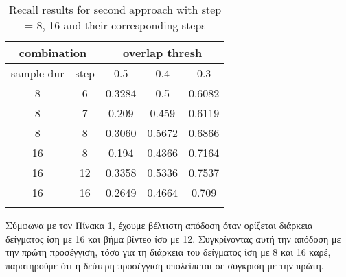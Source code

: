 \begin{center}
\en
\begin{longtable}{||c c||c c c||}
  \hline
  \multicolumn{2}{||c||}{\textbf{combination}} &\multicolumn{3}{|c||}{\textbf{overlap thresh}}\\

  \hline
  sample dur & step &   0.5  &  0.4 &  0.3 \\
  \hline   \hline
  8 & 6 & 0.3284 & 0.5 & 0.6082  \\
  \hline
  8 & 7 & 0.209	& 0.459 & 0.6119 \\
  \hline
  8 & 8 & 0.3060 & 0.5672 & 0.6866 \\
  \hline
  16 & 8  & 0.194 & 0.4366 & 0.7164 \\
  \hline
  16 & 12 & 0.3358 & 0.5336 & 0.7537 \\
  \hline
  16 & 16 & 0.2649 & 0.4664 & 0.709 \\
  
  \hline 

  \caption{Recall results for second approach with step = 8, 16 and their corresponding steps }
  \label{table:gr_conn_app2}
\end{longtable} 
\end{center}

Σύμφωνα με τον Πίνακα \ref{table:gr_conn_app2}, έχουμε βέλτιστη απόδοση όταν ορίζεται διάρκεια δείγματος ίση με 16 και  βήμα βίντεο ίσο με 12.
Συγκρίνοντας αυτή την απόδοση με την πρώτη προσέγγιση, τόσο για τη διάρκεια του δείγματος ίση  με 8 και 16 καρέ, παρατηρούμε  ότι η δεύτερη
προσέγγιση υπολείπεται σε σύγκριση με την πρώτη.

